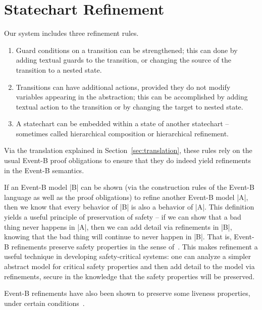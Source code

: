 
\section{Statechart Refinement}
\label{sec:scref}

Our system includes three refinement rules.

\begin{enumerate}
\item Guard conditions on a transition can be strengthened; 
this can done by adding textual guards to the transition, or
changing the source of the transition to a nested state.
\item Transitions can have additional actions, provided they do not
  modify variables appearing in the abstraction; this can be 
  accomplished by adding textual action to the transition 
  or by changing the target to nested state.
\item A statechart can be embedded within a state of another
  statechart -- sometimes called hierarchical composition or
  hierarchical refinement.
\end{enumerate}

Via the translation explained in Section~\ref{sec:translation}, these rules
rely on the usual Event-B proof obligations to ensure that they do
indeed yield refinements in the Event-B semantics.

If an Event-B model |B| can be shown (via the construction rules of
the Event-B language as well as the proof obligations) to refine
another Event-B model |A|, then we know that every behavior of |B| is
also a behavior of |A|. This definition yields a useful principle of
preservation of safety -- if we can show that a bad thing never
happens in |A|, then we can add detail via refinements in |B|, knowing
that the bad thing will continue to never happen in |B|. That is,
Event-B refinements preserve safety properties in the sense
of~\cite{lamport1977proving}. This makes refinement a useful technique
in developing safety-critical systems: one can analyze a simpler
abstract model for critical safety properties and then add detail to
the model via refinements, secure in the knowledge that the safety
properties will be preserved.

Event-B refinements have also been shown to preserve some liveness
properties, under certain conditions~\cite{hoang2016ltl}.

